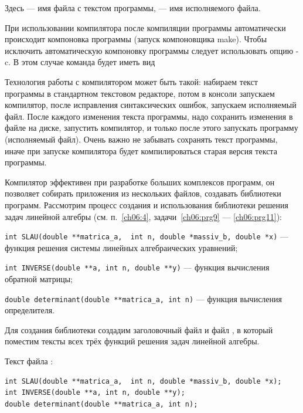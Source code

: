 
Здесь  --- имя файла с текстом программы,  --- имя исполняемого файла. 

При использовании компилятора  после компиляции программы автоматически происходит компоновка программы (запуск
компоновщика make). Чтобы исключить автоматическую компоновку программы следует использовать опцию -c. В этом случае
команда будет иметь вид  


Технология работы с компилятором  может быть такой: набираем текст программы в стандартном текстовом редакторе, потом
в консоли запускаем компилятор, после исправления синтаксических ошибок, запускаем исполняемый файл.  После каждого
изменения текста программы, надо сохранить изменения в файле на диске, запустить компилятор, и только после этого
запускать программу (исполняемый файл). Очень важно не забывать сохранять текст программы, иначе при запуске
компилятора будет компилироваться старая версия текста программы. 


Компилятор  эффективен при разработке больших комплексов программ, он позволяет собирать приложения из нескольких
файлов, создавать библиотеки программ. Рассмотрим процесс создания и использования библиотеки решения задач линейной
алгебры (см. п.~\ref{ch06:4}, задачи~\ref{ch06:prg9} --- \ref{ch06:prg11}):

\lstinline!int SLAU(double **matrica_a,  int n, double *massiv_b, double *x)! --- функция решения системы линейных
алгебраических уравнений;

\lstinline!int INVERSE(double **a, int n, double **y)! --- функция вычисления обратной матрицы;

\lstinline!double determinant(double **matrica_a, int n)! --- функция вычисления определителя.


Для создания библиотеки создадим заголовочный файл  и файл  , в
который поместим тексты всех трёх функций решения задач линейной алгебры.

Текст файла :
\begin{lstlisting}
int SLAU(double **matrica_a,  int n, double *massiv_b, double *x);
int INVERSE(double **a, int n, double **y);
double determinant(double **matrica_a, int n);
\end{lstlisting}

